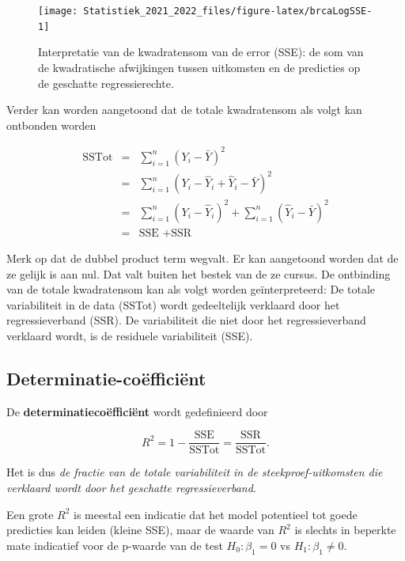 \documentclass[
  12pt,dutch,coursenotes]{book}
\theoremstyle{definition}
\theoremstyle{definition}
\theoremstyle{definition}
\theoremstyle{definition}
\theoremstyle{remark}
\begin{document}
\begin{figure}

{\centering \texttt{[image: Statistiek\_2021\_2022\_files/figure-latex/brcaLogSSE-1]} 

}

\caption{Interpretatie van de kwadratensom van de error (SSE): de som van de kwadratische afwijkingen tussen uitkomsten en de predicties op de geschatte regressierechte.}\label{fig:brcaLogSSE}
\end{figure}

Verder kan worden aangetoond dat de totale kwadratensom als volgt kan ontbonden worden

\begin{eqnarray*}
  \text{SSTot}
    &=&  \sum_{i=1}^n (Y_i-\bar{Y})^2 \\
    &=&  \sum_{i=1}^n (Y_i-\hat{Y}_i+\hat{Y}_i-\bar{Y})^2 \\
    &=&  \sum_{i=1}^n (Y_i-\hat{Y}_i)^2+\sum_{i=1}^n(\hat{Y}_i-\bar{Y})^2 \\
    &=&  \text{SSE }+\text{SSR}  
\end{eqnarray*}

Merk op dat de dubbel product term wegvalt. Er kan aangetoond worden dat de ze gelijk is aan nul. Dat valt buiten het bestek van de ze cursus.
De ontbinding van de totale kwadratensom kan als volgt worden geïnterpreteerd:
De totale variabiliteit in de data (SSTot) wordt gedeeltelijk verklaard door het regressieverband (SSR). De variabiliteit die niet door het regressieverband verklaard wordt, is de residuele variabiliteit (SSE).

\hypertarget{determinatie-couxebfficiuxebnt}{%
\subsection{Determinatie-coëfficiënt}\label{determinatie-couxebfficiuxebnt}}

De \textbf{determinatiecoëfficiënt} wordt gedefinieerd door

\[ R^2 = 1-\frac{\text{SSE}}{\text{SSTot}}=\frac{\text{SSR}}{\text{SSTot}}.\]

Het is dus \emph{de fractie van de totale variabiliteit in de steekproef-uitkomsten die verklaard wordt door het geschatte regressieverband}.

Een grote \(R^2\) is meestal een indicatie dat het model potentieel tot goede predicties kan leiden (kleine SSE), maar de waarde van \(R^2\) is slechts in beperkte mate indicatief voor de p-waarde van de test \(H_0:\beta_1=0\) vs \(H_1:\beta_1\neq0\).
\end{document}
